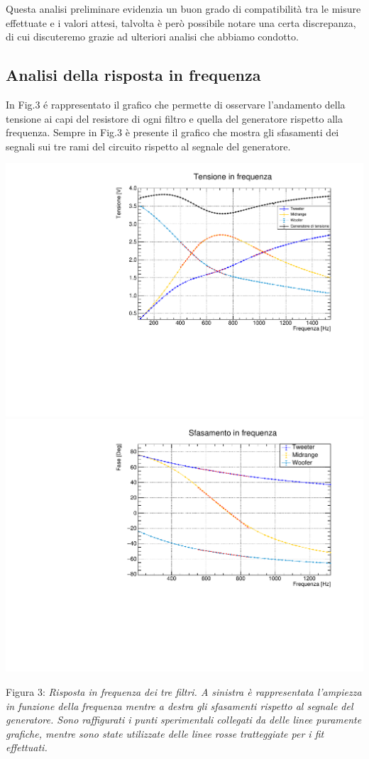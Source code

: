 \documentclass[]{article}
\begin{document}
Questa analisi preliminare evidenzia un buon grado di compatibilità tra le misure effettuate e i valori attesi, talvolta è però possibile notare una certa discrepanza, di cui discuteremo grazie ad ulteriori analisi che abbiamo condotto.
\subsection{Analisi della risposta in frequenza}


\hspace*{\parindent}In Fig.3 é rappresentato il grafico che permette di osservare l'andamento della tensione ai capi del resistore di ogni filtro e quella del generatore rispetto alla frequenza. Sempre in Fig.3 è presente il grafico che mostra gli sfasamenti dei segnali sui tre rami del circuito rispetto al segnale del generatore.
\begin{multicols}{2}
	\includegraphics[width=1\linewidth]{img/Frequenza}	
	\includegraphics[width=1\linewidth]{img/Fasi}
\end{multicols}
\begin{center}
	Figura 3: \emph{Risposta in frequenza dei tre filtri. A sinistra è rappresentata l'ampiezza in funzione della frequenza mentre a destra gli sfasamenti rispetto al segnale del generatore. Sono raffigurati i punti sperimentali collegati da delle linee puramente grafiche, mentre sono state utilizzate delle linee rosse tratteggiate per i fit effettuati.}\\
\end{center}
\end{document}

